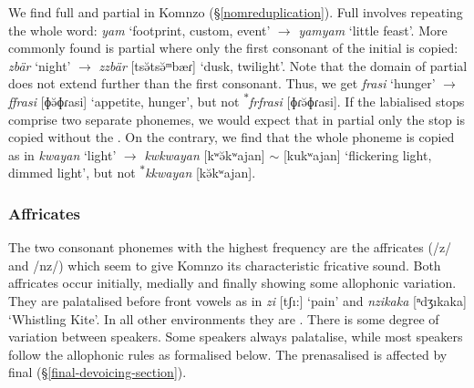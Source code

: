 We find full and partial  in Komnzo (\S{}\ref{nomreduplication}). Full  involves repeating the whole word: \emph{yam} `footprint, custom, event' $\rightarrow$ \emph{yamyam} `little feast'. More commonly found is partial  where only the first consonant of the initial  is copied: \emph{zbär} `night' $\rightarrow$ \emph{zzbär} [tsə̆tsə̆ᵐbæɾ] `dusk, twilight'. Note that the domain of partial  does not extend further than the first consonant. Thus, we get \emph{frasi} `hunger' $\rightarrow$ \emph{ffrasi} [ɸə̆ɸɾasi] `appetite, hunger', but not \textsuperscript{$\ast$}\emph{frfrasi} [ɸɾə̆ɸɾasi]. If the labialised  stops comprise two separate phonemes, we would expect that in partial  only the  stop is copied without the . On the contrary, we find that the whole phoneme is copied as in \emph{kwayan} `light' $\rightarrow$ \emph{kwkwayan} [kʷə̆kʷajan] $\sim$ [kukʷajan] `flickering light, dimmed light', but not \textsuperscript{$\ast$}\emph{kkwayan} [kə̆kʷajan].%

\subsubsection{Affricates} \label{affricates}

The two consonant phonemes with the highest frequency are the affricates (/z/ and /nz/) which seem to give Komnzo its characteristic fricative sound. Both affricates occur initially, medially and finally showing some allophonic variation. They are palatalised before front vowels as in \emph{zi} [tʃı:] `pain' and \emph{nzikaka} [ⁿdʒıkaka] `Whistling Kite'. In all other environments they are . There is some degree of variation between speakers. Some speakers always palatalise, while most speakers follow the allophonic rules as formalised below. The prenasalised  is affected by final  (\S{}\ref{final-devoicing-section}).%

